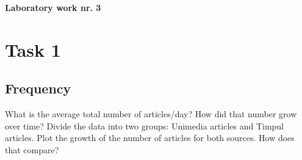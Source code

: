 \documentclass[12pt,a4paper]{article}
\begin{document}
 \begin{center}
 \begin{Huge}
 \textbf{Laboratory work nr. 3}\\[0.2in]
 \end{Huge}
 \end{center}

\section*{Task 1}
 \subsection*{Frequency}

 What is the average total number of articles/day? How did that number grow
over time? Divide the data into two groups: Unimedia articles and Timpul
articles. Plot the growth of the number of articles for both sources. How does
that compare?
\end{document}
